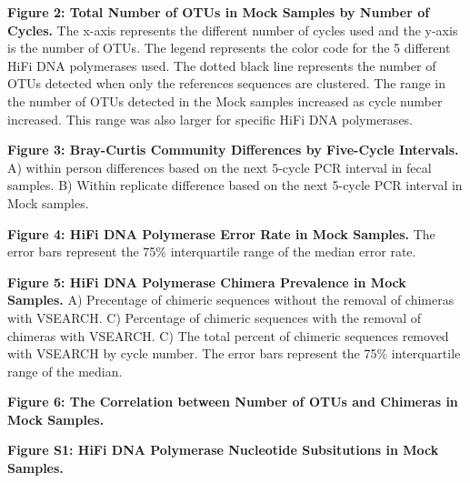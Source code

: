 \documentclass[12pt,]{article}
\begin{document}
\textbf{Figure 2: Total Number of OTUs in Mock Samples by Number of
Cycles.} The x-axis represents the different number of cycles used and
the y-axis is the number of OTUs. The legend represents the color code
for the 5 different HiFi DNA polymerases used. The dotted black line
represents the number of OTUs detected when only the references
sequences are clustered. The range in the number of OTUs detected in the
Mock samples increased as cycle number increased. This range was also
larger for specific HiFi DNA polymerases.

\textbf{Figure 3: Bray-Curtis Community Differences by Five-Cycle
Intervals.} A) within person differences based on the next 5-cycle PCR
interval in fecal samples. B) Within replicate difference based on the
next 5-cycle PCR interval in Mock samples.

\textbf{Figure 4: HiFi DNA Polymerase Error Rate in Mock Samples.} The
error bars represent the 75\% interquartile range of the median error
rate.

\textbf{Figure 5: HiFi DNA Polymerase Chimera Prevalence in Mock
Samples.} A) Precentage of chimeric sequences without the removal of
chimeras with VSEARCH. C) Percentage of chimeric sequences with the
removal of chimeras with VSEARCH. C) The total percent of chimeric
sequences removed with VSEARCH by cycle number. The error bars represent
the 75\% interquartile range of the median.

\textbf{Figure 6: The Correlation between Number of OTUs and Chimeras in
Mock Samples.}

\newpage

\textbf{Figure S1: HiFi DNA Polymerase Nucleotide Subsitutions in Mock
Samples.}
\end{document}
